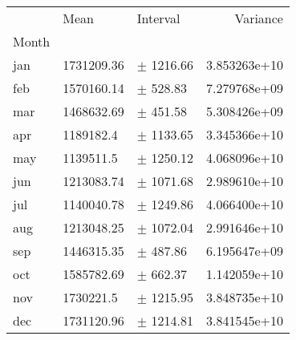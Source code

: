 \begin{tabular}{lllr}
\toprule
{} &        Mean &       Interval &      Variance \\
Month &             &                &               \\
\midrule
jan   &  1731209.36 &  $\pm$ 1216.66 &  3.853263e+10 \\
feb   &  1570160.14 &   $\pm$ 528.83 &  7.279768e+09 \\
mar   &  1468632.69 &   $\pm$ 451.58 &  5.308426e+09 \\
apr   &   1189182.4 &  $\pm$ 1133.65 &  3.345366e+10 \\
may   &   1139511.5 &  $\pm$ 1250.12 &  4.068096e+10 \\
jun   &  1213083.74 &  $\pm$ 1071.68 &  2.989610e+10 \\
jul   &  1140040.78 &  $\pm$ 1249.86 &  4.066400e+10 \\
aug   &  1213048.25 &  $\pm$ 1072.04 &  2.991646e+10 \\
sep   &  1446315.35 &   $\pm$ 487.86 &  6.195647e+09 \\
oct   &  1585782.69 &   $\pm$ 662.37 &  1.142059e+10 \\
nov   &   1730221.5 &  $\pm$ 1215.95 &  3.848735e+10 \\
dec   &  1731120.96 &  $\pm$ 1214.81 &  3.841545e+10 \\
\bottomrule
\end{tabular}
